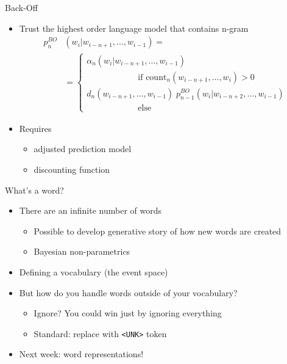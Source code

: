\documentclass[compress]{beamer}
\begin{document}
\begin{frame}{Back-Off}

\begin{itemize}
\item Trust the highest order language model that contains n-gram
\begin{equation*}
\begin{split}
p^{BO}_n&(w_i|w_{i-n+1},...,w_{i-1}) =\\
& =
\begin{cases}
\alpha_n(w_i|w_{i-n+1},...,w_{i-1}) \\
\phantom{--- ---} \text{if count$_n(w_{i-n+1},...,w_i)>0$} \\[2mm]
d_n(w_{i-n+1},...,w_{i-1}) \; p^{BO}_{n-1}(w_i|w_{i-n+2},...,w_{i-1}) \\
\phantom{--- ---}\text{else}
\end{cases}
\end{split}
\end{equation*}

\item Requires
\begin{itemize}
\item adjusted prediction model 
\item discounting function 
\end{itemize}
\end{itemize}

\end{frame}

\begin{frame}{What's a word?}

\begin{itemize}
	\item There are an infinite number of words
		\begin{itemize}
			\item Possible to develop generative story of how new words are created
			\item Bayesian non-parametrics
		\end{itemize}
	\pause
	\item Defining a vocabulary (the event space)
	\item But how do you handle words outside of your vocabulary?
	\pause
	\begin{itemize}
		\item Ignore? You could win just by ignoring everything
		\item Standard: replace with \texttt{<UNK>} token
	\end{itemize}
	\item Next week: word representations!
\end{itemize}


\end{frame}
\end{document}

